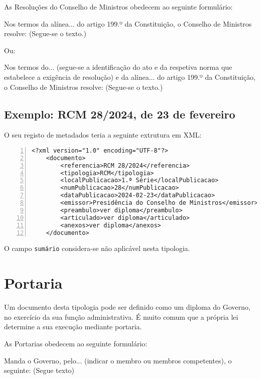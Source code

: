 As Resoluções do Conselho de Ministros obedecem ao seguinte formulário:

\begin{quoting}
    Nos termos da alínea... do artigo 199.º da Constituição, o Conselho de Ministros 
    resolve:
        (Segue-se o texto.)
\end{quoting}

Ou:
\begin{quoting}
    Nos termos do... (segue-se a identificação do ato e da respetiva norma que 
    estabelece a exigência de resolução) e da alínea... do artigo 199.º da Constituição, 
    o Conselho de Ministros resolve:
    (Segue-se o texto.)
\end{quoting}


\subsection{Exemplo: RCM 28/2024, de 23 de fevereiro} 
    
O seu registo de metadados teria a seguinte extrutura em XML:
    
\begin{Verbatim}[frame=single, numbers=left, fontsize=\small, commandchars=\\\{\}]
<?xml version="1.0" encoding="UTF-8"?>
    <documento>
        <referencia>RCM 28/2024</referencia>
        <tipologia>RCM</tipologia>
        <localPublicacao>1.ª Série</localPublicacao>
        <numPublicacao>28</numPublicacao>
        <dataPublicacao>2024-02-23</dataPublicacao>
        <emissor>Presidência do Conselho de Ministros</emissor>
        <preambulo>ver diploma</preambulo>
        <articulado>ver diploma</articulado>
        <anexos>ver diploma</anexos>
    </documento>
\end{Verbatim}

O campo \texttt{sumário} considera-se não aplicável nesta tipologia.


\section{Portaria}

Um documento desta tipologia pode ser definido como um diploma do Governo, 
no exercício da sua função administrativa. 
É muito comum que a própria lei determine a sua execução mediante portaria.

As Portarias obedecem ao seguinte formulário:

\begin{quoting}
    Manda o Governo, pelo... (indicar o membro ou membros competentes), 
    o seguinte: 
    (Segue texto)
\end{quoting}


